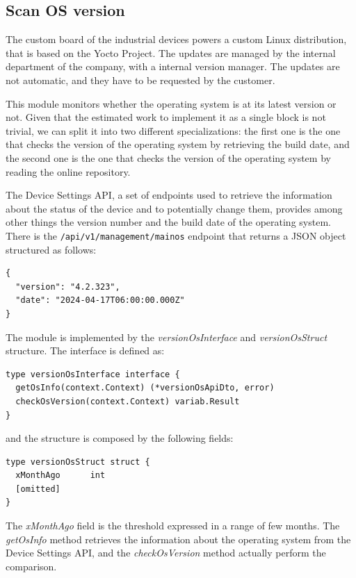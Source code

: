 \subsection{Scan OS version}

The custom board of the industrial devices powers a custom Linux distribution, that is based on the Yocto Project. The updates are managed by the internal department of the company, with a internal version manager. The updates are not automatic, and they have to be requested by the customer.

This module monitors whether the operating system is at its latest version or not. Given that the estimated work to implement it as a single block is not trivial, we can split it into two different specializations: the first one is the one that checks the version of the operating system by retrieving the build date, and the second one is the one that checks the version of the operating system by reading the online repository.

The Device Settings API, a set of endpoints used to retrieve the information about the status of the device and to potentially change them, provides among other things the version number and the build date of the operating system. There is the \texttt{/api/v1/management/mainos} endpoint that returns a JSON object structured as follows:

\begin{lstlisting}
{
  "version": "4.2.323",
  "date": "2024-04-17T06:00:00.000Z"
}
\end{lstlisting}

The module is implemented by the \textit{versionOsInterface} and \textit{versionOsStruct} structure. The interface is defined as:

\begin{lstlisting}[style=golang]
type versionOsInterface interface {
  getOsInfo(context.Context) (*versionOsApiDto, error)
  checkOsVersion(context.Context) variab.Result
}
\end{lstlisting}

and the structure is composed by the following fields:

\begin{lstlisting}[style=golang]
type versionOsStruct struct {
  xMonthAgo      int
  [omitted]
}
\end{lstlisting}

The \textit{xMonthAgo} field is the threshold expressed in a range of few months. The \textit{getOsInfo} method retrieves the information about the operating system from the Device Settings API, and the \textit{checkOsVersion} method actually perform the comparison.

